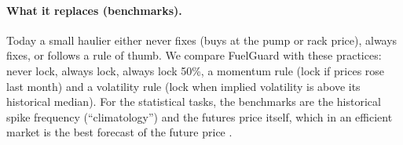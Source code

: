 \paragraph{What it replaces (benchmarks).} Today a small haulier either never fixes (buys at the pump or
rack price), always fixes, or follows a rule of thumb. We compare FuelGuard with these practices: never
lock, always lock, always lock 50\%, a momentum rule (lock if prices rose last month) and a volatility rule
(lock when implied volatility is above its historical median). For the statistical tasks, the benchmarks
are the historical spike frequency (``climatology'') and the futures price itself, which in an efficient
market is the best forecast of the future price \citep{fama1987,alquist2013}.
